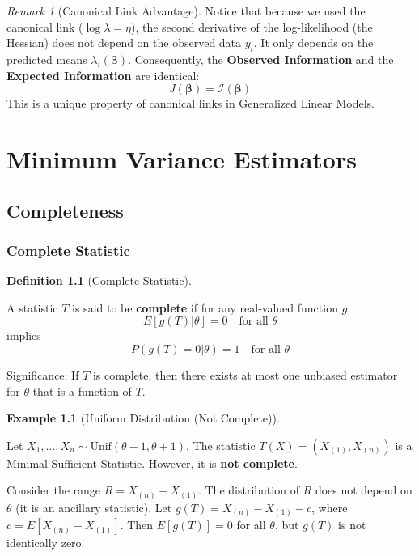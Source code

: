 \documentclass[
  letterpaper,
  DIV=11,
  numbers=noendperiod]{scrreprt}
\renewcommand{\[}{\begin{equation}}
\renewcommand{\]}{\end{equation}}
\theoremstyle{definition}
\newtheorem{definition}{Definition}[chapter]
\theoremstyle{plain}
\theoremstyle{plain}
\theoremstyle{plain}
\theoremstyle{definition}
\newtheorem{example}{Example}[chapter]
\theoremstyle{plain}
\theoremstyle{remark}
\newtheorem{refremark}{Remark}[chapter]
\begin{document}
\begin{refremark}[Canonical Link Advantage]
Notice that because we used the canonical link
(\(\log \lambda = \eta\)), the second derivative of the log-likelihood
(the Hessian) does not depend on the observed data \(y_i\). It only
depends on the predicted means \(\lambda_i(\boldsymbol{\beta})\).
Consequently, the \textbf{Observed Information} and the \textbf{Expected
Information} are identical: \[
J(\boldsymbol{\beta}) = \mathcal{I}(\boldsymbol{\beta})
\] This is a unique property of canonical links in Generalized Linear
Models.

\label{rem-canonical-simplicity}

\end{refremark}


\chapter{Minimum Variance Estimators}\label{minimum-variance-estimators}

\section{Completeness}\label{completeness}

\subsection{Complete Statistic}\label{complete-statistic}

\begin{definition}[Complete
Statistic]\protect\hypertarget{def-completeness}{}\label{def-completeness}

A statistic \(T\) is said to be \textbf{complete} if for any real-valued
function \(g\), \[E[g(T)|\theta] = 0 \quad \text{for all } \theta\]
implies \[P(g(T) = 0 | \theta) = 1 \quad \text{for all } \theta\]

\end{definition}

Significance: If \(T\) is complete, then there exists at most one
unbiased estimator for \(\theta\) that is a function of \(T\).

\begin{example}[Uniform Distribution (Not
Complete)]\protect\hypertarget{exm-uniform-incomplete}{}\label{exm-uniform-incomplete}

Let \(X_1, \dots, X_n \sim \text{Unif}(\theta-1, \theta+1)\). The
statistic \(T(X) = (X_{(1)}, X_{(n)})\) is a Minimal Sufficient
Statistic. However, it is \textbf{not complete}.

Consider the range \(R = X_{(n)} - X_{(1)}\). The distribution of \(R\)
does not depend on \(\theta\) (it is an ancillary statistic). Let
\(g(T) = X_{(n)} - X_{(1)} - c\), where \(c = E[X_{(n)} - X_{(1)}]\).
Then \(E[g(T)] = 0\) for all \(\theta\), but \(g(T)\) is not identically
zero.

\end{example}
\end{document}
